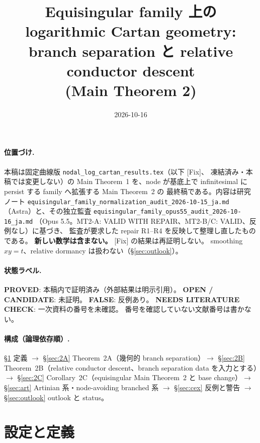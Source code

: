 \documentclass[11pt,a4paper]{article}
\title{Equisingular family 上の logarithmic Cartan geometry:\\
branch separation と relative conductor descent\\[2pt]
{\large (Main Theorem 2)}}
\author{}
\date{2026-10-16}
\numberwithin{equation}{section}
\theoremstyle{definition}
\begin{document}
\maketitle

\paragraph{位置づけ.}
本稿は固定曲線版 \texttt{nodal\_log\_cartan\_results.tex}（以下 [Fix]、
凍結済み・本稿では変更しない）の Main Theorem~1 を、node が基底上で
infinitesimal に persist する family へ拡張する Main Theorem~2 の
最終稿である。内容は研究ノート
\texttt{equisingular\_family\_normalization\_audit\_2026-10-15\_ja.md}
（Astra）と、その独立監査
\texttt{equisingular\_family\_opus55\_audit\_2026-10-16\_ja.md}
（Opus 5.5。MT2-A: VALID WITH REPAIR、MT2-B/C: VALID、反例なし）に基づき、
監査が要求した repair R1--R4 を反映して整理し直したものである。
\textbf{新しい数学は含まない。} [Fix] の結果は再証明しない。
smoothing $xy=t$、relative dormancy は扱わない（\S\ref{sec:outlook}）。

\paragraph{状態ラベル.}
\textbf{PROVED}: 本稿内で証明済み（外部結果は明示引用）。
\textbf{OPEN / CANDIDATE}: 未証明。
\textbf{FALSE}: 反例あり。
\textbf{NEEDS LITERATURE CHECK}: 一次資料の番号を未確認。
番号を確認していない文献番号は書かない。

\paragraph{構成（論理依存順）.}
\S\ref{sec:setup} 定義 $\to$
\S\ref{sec:2A} Theorem~2A（幾何的 branch separation）$\to$
\S\ref{sec:2B} Theorem~2B（relative conductor descent、branch separation
data を入力とする）$\to$
\S\ref{sec:2C} Corollary~2C（equisingular Main Theorem~2 と base change）$\to$
\S\ref{sec:art} Artinian 系・node-avoiding branched 系 $\to$
\S\ref{sec:cex} 反例と警告 $\to$
\S\ref{sec:outlook} outlook と status。

\tableofcontents

\section{設定と定義}\label{sec:setup}
\end{document}
